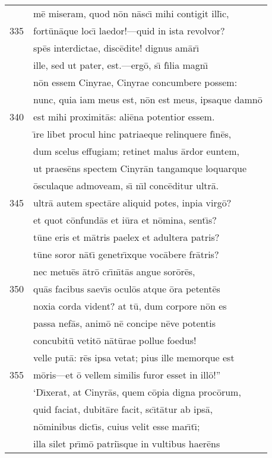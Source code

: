 \documentclass[paper=6in:9in,pagesize=pdftex,
               headinclude=on,footinclude=on,12pt]{scrbook}
\begin{document}
\begin{longtable}[p]{ r l }
 & m\=e miseram, quod n\=on n\=asc\={\i} mihi contigit ill\={\i}c,\\ 
335 & fort\=un\=aque loc\={\i} laedor!—quid in ista revolvor?\\ 
 & sp\=es interdictae, disc\=edite! dignus am\=ar\={\i}\\ 
 & ille, sed ut pater, est.—erg\=o, s\={\i} f\={\i}lia magn\={\i}\\ 
 & n\=on essem Cinyrae, Cinyrae concumbere possem:\\ 
 & nunc, quia iam meus est, n\=on est meus, ipsaque damn\=o\\ 
340 & est mihi proximit\=as: ali\=ena potentior essem.\\ 
 & \={\i}re libet procul hinc patriaeque relinquere f\={\i}n\=es,\\ 
 & dum scelus effugiam; retinet malus \=ardor euntem,\\ 
 & ut praes\=ens spectem Cinyr\=an tangamque loquarque\\ 
 & \=osculaque admoveam, s\={\i} n\={\i}l conc\=editur ultr\=a.\\ 
345 & ultr\=a autem spect\=are aliquid potes, inpia virg\=o?\\ 
 & et quot c\=onfund\=as et i\=ura et n\=omina, sent\={\i}s?\\ 
 & t\=une eris et m\=atris paelex et adultera patris?\\ 
 & t\=une soror n\=at\={\i} genetr\={\i}xque voc\=abere fr\=atris?\\ 
 & nec metu\=es \=atr\=o cr\={\i}n\={\i}t\=as angue sor\=or\=es,\\ 
350 & qu\=as facibus saev\={\i}s ocul\=os atque \=ora petent\=es\\ 
 & noxia corda vident? at t\=u, dum corpore n\=on es\\ 
 & passa nef\=as, anim\=o n\=e concipe n\=eve potentis\\ 
 & concubit\=u vetit\=o n\=at\=urae pollue foedus!\\ 
 & velle put\=a: r\=es ipsa vetat; pius ille memorque est\\ 
355 & m\=oris—et \=o vellem similis furor esset in ill\=o!''\\ 
 & \indent `D\={\i}xerat, at Cinyr\=as, quem c\=opia digna proc\=orum,\\ 
 & quid faciat, dubit\=are facit, sc\={\i}t\=atur ab ips\=a,\\ 
 & n\=ominibus dict\={\i}s, cuius velit esse mar\={\i}t\={\i};\\ 
 & illa silet pr\={\i}m\=o patri\={\i}sque in vultibus haer\=ens\\ 

\end{longtable}
\end{document}
